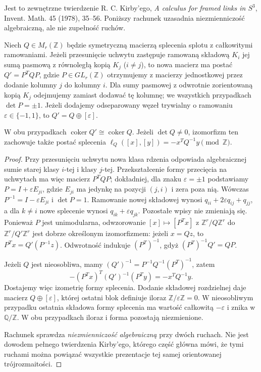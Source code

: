 \begin{uwaga}
Jest to zewnętrzne twierdzenie R. C. Kirby'ego,
\emph{A calculus for framed links in $S^3$},
Invent. Math. 45 (1978), 35--56. Poniższy rachunek
uzasadnia niezmienniczość algebraiczną, ale nie
zupełność ruchów.
\end{uwaga}

\begin{stwierdzenie}
\label{st:kt-kirby-matrix}
Niech $Q\in M_r(\mathbb Z)$ będzie symetryczną macierzą
splecenia splotu z całkowitymi ramowaniami.
Jeżeli przesunięcie uchwytu zastępuje ramowaną składową
$K_i$ jej sumą pasmową z równoległą kopią
$K_j$ ($i\ne j$), to nowa macierz ma postać
$Q'=P^TQP$, gdzie $P\in GL_r(\mathbb Z)$
otrzymujemy z macierzy jednostkowej przez
dodanie kolumny $j$ do kolumny $i$.
Dla sumy pasmowej z odwrotnie zorientowaną
kopią $K_j$ odejmujemy zamiast dodawać
tę kolumnę; we wszystkich przypadkach
$\det P=\pm1$.
Jeżeli dodajemy odseparowany węzeł trywialny
o ramowaniu $\varepsilon\in\{-1,1\}$,
to $Q'=Q\oplus[\varepsilon]$.

W obu przypadkach
$\operatorname{coker}Q'\cong\operatorname{coker}Q$.
Jeżeli $\det Q\ne0$, izomorfizm ten zachowuje
także postać splecenia
$\ell_Q([x],[y])=-x^TQ^{-1}y\pmod{\mathbb Z}$.
\end{stwierdzenie}

\begin{proof}
Przy przesunięciu uchwytu nowa klasa rdzenia
odpowiada algebraicznej sumie starej klasy $i$-tej
i klasy $j$-tej. Przekształcenie formy przecięcia
na uchwytach ma więc macierz $P^TQP$;
dokładniej, dla znaku $\varepsilon=\pm1$ podstawiamy
$P=I+\varepsilon E_{ji}$, gdzie $E_{ji}$ ma jedynkę
na pozycji $(j,i)$ i zera poza nią. Wówczas
$P^{-1}=I-\varepsilon E_{ji}$ i $\det P=1$.
Ramowanie nowej składowej wynosi
$q_{ii}+2\varepsilon q_{ij}+q_{jj}$,
a dla $k\ne i$ nowe splecenie wynosi
$q_{ik}+\varepsilon q_{jk}$. Pozostałe wpisy
nie zmieniają się.
Ponieważ $P$ jest unimodularna,
odwzorowanie $[x]\mapsto[P^Tx]$
z $\mathbb Z^r/Q\mathbb Z^r$
do $\mathbb Z^r/Q'\mathbb Z^r$
jest dobrze określonym izomorfizmem:
jeżeli $x=Qz$, to
$P^Tx=Q'(P^{-1}z)$. Odwrotność indukuje
$(P^T)^{-1}$, gdyż $(P^T)^{-1}Q'=QP$.

Jeżeli $Q$ jest nieosobliwa,
mamy $(Q')^{-1}=P^{-1}Q^{-1}(P^T)^{-1}$, zatem
\[
-(P^Tx)^T(Q')^{-1}(P^Ty)
=-x^TQ^{-1}y.
\]
Dostajemy więc izometrię formy splecenia.
Dodanie składowej rozdzielnej daje macierz
$Q\oplus[\varepsilon]$, której ostatni blok
definiuje iloraz $\mathbb Z/\varepsilon\mathbb Z=0$.
W nieosobliwym przypadku ostatnia składowa
formy splecenia ma wartość całkowitą
$-\varepsilon$ i znika w $\mathbb Q/\mathbb Z$.
W obu przypadkach iloraz i forma pozostają
niezmienione.

Rachunek sprawdza \emph{niezmienniczość algebraiczną}
przy dwóch ruchach. Nie jest dowodem pełnego
twierdzenia Kirby'ego, którego część główna mówi,
że tymi ruchami można powiązać wszystkie
prezentacje tej samej orientowanej trójrozmaitości.
\end{proof}

